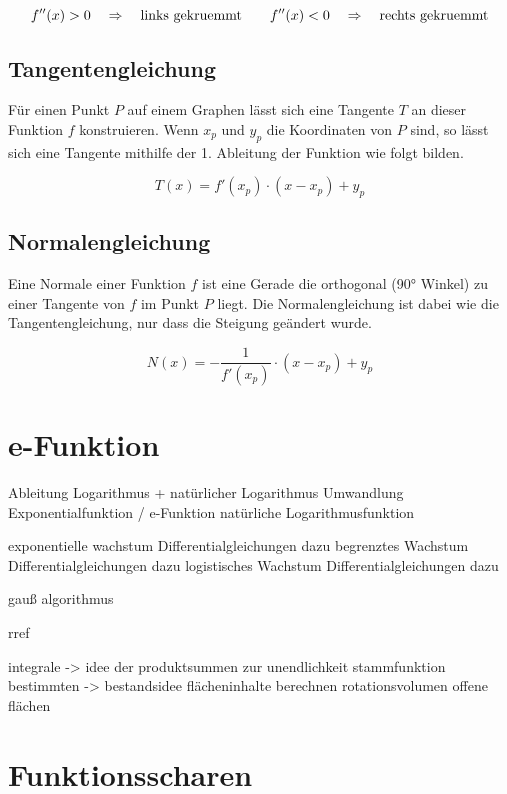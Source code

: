 \begin{equation*}
    f''(x) > 0 \quad \Rightarrow \quad \textnormal{links gekruemmt} \qquad f''(x) < 0 \quad \Rightarrow \quad \textnormal{rechts gekruemmt}
\end{equation*}

\subsection{Tangentengleichung}

Für einen Punkt $P$ auf einem Graphen lässt sich eine Tangente $T$ an dieser Funktion $f$
konstruieren. Wenn $x_p$ und $y_p$ die Koordinaten von $P$ sind, so lässt sich
eine Tangente mithilfe der 1. Ableitung der Funktion wie folgt bilden.

\begin{equation*}
    T(x) = f'(x_p) \cdot (x - x_p) + y_p
\end{equation*}

\subsection{Normalengleichung}

Eine Normale einer Funktion $f$ ist eine Gerade die orthogonal (90° Winkel) zu einer Tangente
von $f$ im Punkt $P$ liegt. Die Normalengleichung ist dabei wie die Tangentengleichung, nur
dass die Steigung geändert wurde.

\begin{equation*}
    N(x) = -\frac{1}{f'(x_p)} \cdot (x - x_p) + y_p
\end{equation*}

\section{e-Funktion}

Ableitung
Logarithmus + natürlicher Logarithmus
Umwandlung Exponentialfunktion / e-Funktion
natürliche Logarithmusfunktion

exponentielle wachstum
Differentialgleichungen dazu
begrenztes Wachstum
Differentialgleichungen dazu
logistisches Wachstum
Differentialgleichungen dazu

gauß algorithmus

rref

integrale -> idee der produktsummen zur unendlichkeit
stammfunktion bestimmten -> bestandsidee
flächeninhalte berechnen
rotationsvolumen
offene flächen


\section{Funktionsscharen}

